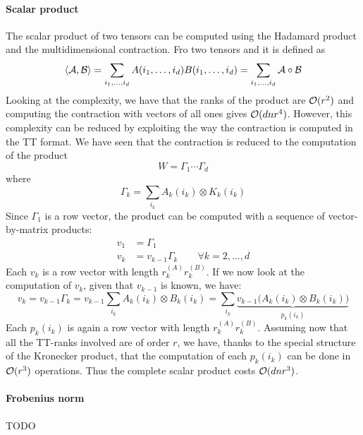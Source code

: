 \paragraph{Scalar product}
The scalar product of two tensors can be computed using the Hadamard product and the multidimensional contraction. Fro two tensors \A and \B it is defined as
\begin{equation*}
  \langle \mathcal{A}, \mathcal{B} \rangle = \sum_{i_1,\ldots,i_d} A(i_1,\ldots,i_d)B(i_1,\ldots,i_d) = \sum_{i_1,\ldots,i_d} \mathcal{A} \circ \mathcal{B}
\end{equation*}
Looking at the complexity, we have that the ranks of the product are $\mathcal{O}(r^2)$ and computing the contraction with vectors of all ones gives $\mathcal{O}(dnr^4)$.
However, this complexity can be reduced by exploiting the way the contraction is computed in the TT format. We have seen that the contraction is reduced to the computation of the product
\begin{equation*}
  W = \Gamma_1 \cdots \Gamma_d
\end{equation*}
where
\begin{equation*}
  \Gamma_k = \sum_{i_k}A_k(i_k) \otimes K_k(i_k)
\end{equation*}
Since $\Gamma_1$ is a row vector, the product can be computed with a sequence of vector-by-matrix products:
\begin{equation*}
  \begin{split}
    v_1 &= \Gamma_1\\
    v_k &= v_{k-1} \Gamma_k \qquad \forall k = 2,\ldots,d
  \end{split}
\end{equation*}
Each $v_k$ is a row vector with length $r_k^{(A)} r_k^{(B)}$. If we now look at the computation of $v_k$, given that $v_{k-1}$ is known, we have:
\begin{equation*}
  v_k = v_{k-1} \Gamma_k = v_{k-1} \sum_{i_k} A_k(i_k) \otimes B_k(i_k) = \sum_{i_k} \underbrace{v_{k-1} \Big( A_k(i_k) \otimes B_k(i_k) \Big) }_{p_k(i_k)}
\end{equation*}
Each $p_k(i_k)$ is again a row vector with length $r_k^{(A)} r_k^{(B)}$.
Assuming now that all the TT-ranks involved are of order $r$, we have, thanks to the special structure of the Kronecker product, that the computation of each $p_k(i_k)$ can be done in $\mathcal{O}(r^3)$ operations. Thus the complete scalar product costs $\mathcal{O}(dnr^3)$.

\paragraph{Frobenius norm}
TODO

